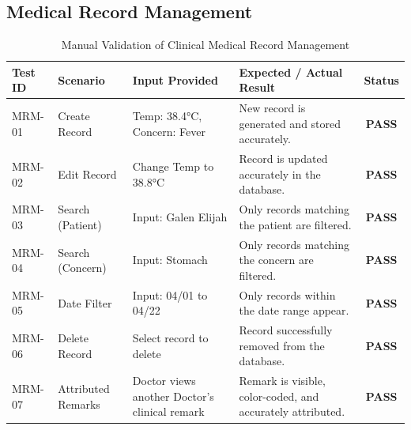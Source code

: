 \subsection{Medical Record Management}
\begin{table}[H]
\centering
\caption{Manual Validation of Clinical Medical Record Management}
\begin{tabularx}{\textwidth}{|l|Y|Y|Y|c|}
\hline
\textbf{Test ID} & \textbf{Scenario} & \textbf{Input Provided} & \textbf{Expected / Actual Result} & \textbf{Status} \\
\hline
MRM-01 & Create Record & Temp: 38.4°C, Concern: Fever & New record is generated and stored accurately. & \textbf{PASS} \\
\hline
MRM-02 & Edit Record & Change Temp to 38.8°C & Record is updated accurately in the database. & \textbf{PASS} \\
\hline
MRM-03 & Search (Patient) & Input: Galen Elijah & Only records matching the patient are filtered. & \textbf{PASS} \\
\hline
MRM-04 & Search (Concern) & Input: Stomach & Only records matching the concern are filtered. & \textbf{PASS} \\
\hline
MRM-05 & Date Filter & Input: 04/01 to 04/22 & Only records within the date range appear. & \textbf{PASS} \\
\hline
MRM-06 & Delete Record & Select record to delete & Record successfully removed from the database. & \textbf{PASS} \\
\hline
MRM-07 & Attributed Remarks & Doctor views another Doctor's clinical remark & Remark is visible, color-coded, and accurately attributed. & \textbf{PASS} \\
\hline
\end{tabularx}
\end{table}

